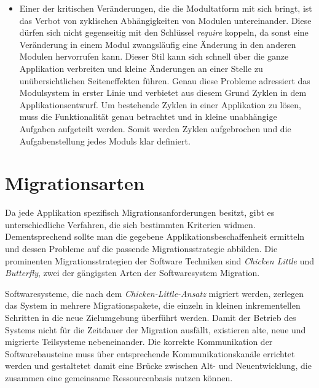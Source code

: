 \begin{itemize}
	\item Einer der kritischen Veränderungen, die die Modultatform mit sich bringt, ist das Verbot von zyklischen Abhängigkeiten von Modulen untereinander. Diese dürfen sich nicht gegenseitig mit den Schlüssel \textit{require} koppeln, da sonst eine Veränderung in einem Modul zwangsläufig eine Änderung in den anderen Modulen hervorrufen kann. Dieser Stil kann sich schnell über die ganze Applikation verbreiten und kleine Änderungen an einer Stelle zu unübersichtlichen Seiteneffekten führen. Genau diese Probleme adressiert das Modulsystem in erster Linie und verbietet aus diesem Grund Zyklen in dem Applikationsentwurf. Um bestehende Zyklen in einer Applikation zu lösen, muss die Funktionalität genau betrachtet und in kleine unabhängige Aufgaben aufgeteilt werden. Somit werden Zyklen aufgebrochen und die Aufgabenstellung jedes Moduls klar definiert. \cite{java9modRevealed,modulProgJava9,modulMitJava9} 
\end{itemize}

\section{Migrationsarten} \label{Migratiosarten}

	Da jede Applikation spezifisch Migrationsanforderungen besitzt, gibt es unterschiedliche Verfahren, die sich bestimmten Kriterien widmen. Dementsprechend sollte man die gegebene Applikationsbeschaffenheit ermitteln und dessen Probleme auf die passende Migrationsstrategie abbilden. Die prominenten Migrationsstrategien der Software Techniken sind \textit{Chicken Little} und \textit{Butterfly}, zwei der gängigsten Arten der Softwaresystem Migration. \cite{sneed2016softwaremigration} \bigbreak


	Softwaresysteme, die nach dem \textit{Chicken-Little-Ansatz} migriert werden, zerlegen das System in mehrere Migrationspakete, die einzeln in kleinen inkrementellen Schritten in die neue Zielumgebung überführt werden. Damit der Betrieb des Systems nicht für die Zeitdauer der Migration ausfällt, existieren alte, neue und migrierte Teilsysteme nebeneinander. Die korrekte Kommunikation der Softwarebausteine muss über entsprechende Kommunikationskanäle errichtet werden und gestaltetet damit eine Brücke zwischen Alt- und Neuentwicklung, die zusammen eine gemeinsame Ressourcenbasis nutzen können. \cite{sneed2016softwaremigration} \bigbreak

